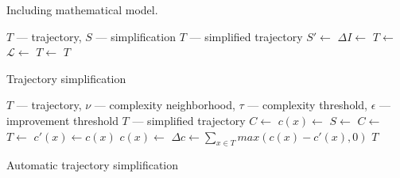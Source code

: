 Including mathematical model.

\begin{algorithm}
  \begin{algorithmic}[1]
	  \Require $T$ --- trajectory, $S$ --- simplification
	  \Ensure $T$ --- simplified trajectory
			\State $S' \gets$  
			\State
			  \State $\Delta I \gets$ 
				\State $T \gets$ 
			\Else %
			  \State $\mathcal{L} \gets$  
				 
					  \State $T \gets$ 
					\EndFor
				\EndFor
			\EndIf
			\State
			\State {}
			\State \Return $T$
		\EndProcedure
  \end{algorithmic}
	\caption{Trajectory simplification}
  \label{alg:simplify}
\end{algorithm}

\begin{algorithm}
  \begin{algorithmic}[1]
	  \Require $T$ --- trajectory, $\nu$ --- complexity neighborhood, $\tau$ --- complexity threshold, $\epsilon$ --- improvement threshold
	  \Ensure $T$ --- simplified trajectory
			\State $C \gets$  
			\State $c(x) \gets$ 
			\State
			\Repeat
			  \State $S \gets$ 
				\State $C \gets$ 
			  \State
					\State $T \gets$ 
			  \EndFor
				\State
				\State $c'(x) \gets c(x)$ %
				\State $c(x) \gets$ 
				\State
				\State $\Delta c \gets \sum_{x \in T}{max(c(x) - c'(x), 0)}$
				\State {}
			\State
			\State \Return $T$
		\EndProcedure
  \end{algorithmic}
	\caption{Automatic trajectory simplification}
  \label{alg:auto-simplify}
\end{algorithm}